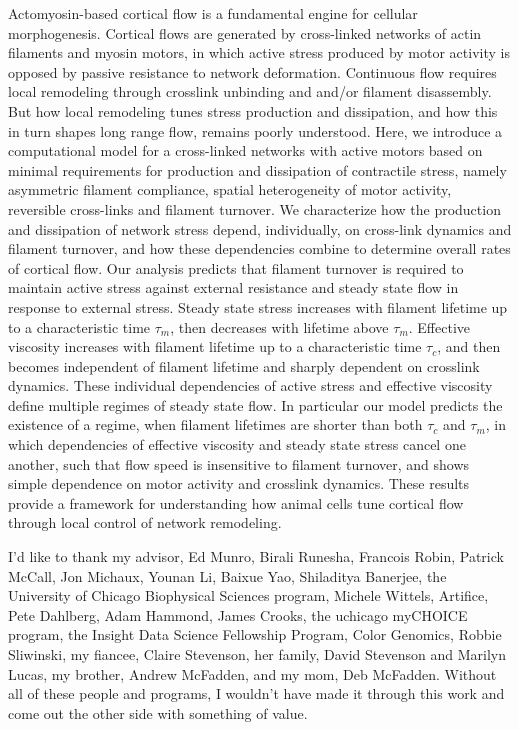 \documentclass{easychithesis}
\begin{document}
Actomyosin-based cortical flow is a fundamental engine for cellular morphogenesis.  Cortical flows are generated by cross-linked networks of actin filaments and myosin motors, in which active stress produced by motor activity is opposed by passive resistance to network deformation.  Continuous flow requires local remodeling through crosslink unbinding and and/or filament disassembly. But how local remodeling tunes stress production and dissipation, and how this in turn shapes long range flow, remains poorly understood. Here, we introduce a computational model for a cross-linked networks with active motors based on minimal requirements for production and dissipation of contractile stress, namely asymmetric filament compliance, spatial heterogeneity of motor activity, reversible cross-links and filament turnover.  We characterize how the production and dissipation of network stress depend, individually, on cross-link dynamics and filament turnover, and how these dependencies combine to determine overall rates of cortical flow. Our analysis predicts that filament turnover is required to maintain active stress against external resistance and steady state flow in response to external stress. Steady state stress increases with filament lifetime up to a characteristic time $\tau_{m}$, then decreases with lifetime above $\tau_{m}$.   Effective viscosity increases with filament lifetime up to a characteristic time $\tau_c$, and then becomes independent of filament lifetime and sharply dependent on crosslink dynamics.  These individual dependencies of active stress and effective viscosity define multiple regimes of steady state flow.  In particular our model predicts the existence of a regime, when filament lifetimes are shorter than both $\tau_c$ and $\tau_{m}$, in which dependencies of effective viscosity and steady state stress cancel one another, such that flow speed is insensitive to filament turnover, and shows simple dependence on motor activity and crosslink dynamics.  These results provide a framework for understanding how animal cells tune cortical flow through local control of network remodeling.

I'd like to thank my advisor, Ed Munro, Birali Runesha, Francois Robin, Patrick McCall, Jon Michaux, Younan Li, Baixue Yao, Shiladitya Banerjee, the University of Chicago Biophysical Sciences program, Michele Wittels, Artifice, Pete Dahlberg, Adam Hammond, James Crooks, the uchicago myCHOICE program, the Insight Data Science Fellowship Program, Color Genomics, Robbie Sliwinski, my fiancee, Claire Stevenson, her family, David Stevenson and Marilyn Lucas, my brother, Andrew McFadden, and my mom, Deb McFadden.  Without all of these people and programs, I wouldn't have made it through this work and come out the other side with something of value.
\end{document}
